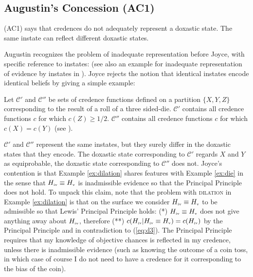 \documentclass[11pt]{article}
\begin{document}
\subsection{Augustin's Concession (AC1)}
\label{jj1}

(AC1) says that credences do not adequately represent a doxastic state.
The same instate can reflect different doxastic states.

Augustin recognizes the problem of inadequate representation before
Joyce, with specific reference to instates:   (see also an example for
inadequate representation of evidence by instates in
). Joyce rejects the notion that
identical instates encode identical beliefs by giving a simple
example:

\begin{quotex}
  \label{ex:die} Let $\mathcal{C}'$ and
  $\mathcal{C}''$ be sets of credence functions defined on a partition
  $\{X,Y,Z\}$ corresponding to the result of a roll of a three
  sided-die. $\mathcal{C}'$ contains all credence functions $c$ for
  which $c(Z)\geq{}1/2$. $\mathcal{C}''$ contains all credence
  functions $c$ for which $c(X)=c(Y)$ (see ).
\end{quotex}

$\mathcal{C}'$ and $\mathcal{C}''$ represent the same instates, but
they surely differ in the doxastic states that they encode. The
doxastic state corresponding to $\mathcal{C}'$ regards $X$ and $Y$ as
equiprobable, the doxastic state corresponding to $\mathcal{C}''$ does
not. Joyce's contention is that Example \ref{ex:dilation} shares
features with Example \ref{ex:die} in the sense that
$H_{\mbox{\tiny{iv}}}\equiv{}H_{\mbox{\tiny{v}}}$ is inadmissible
evidence so that the Principal Principle does not hold. To unpack this
claim, note that the problem with \textsc{dilation} in Example
\ref{ex:dilation} is that on the surface we consider
$H_{\mbox{\tiny{iv}}}\equiv{}H_{\mbox{\tiny{v}}}$ to be admissible so
that Lewis' Principal Principle holds: (*)
$H_{\mbox{\tiny{iv}}}\equiv{}H_{\mbox{\tiny{v}}}$ does not give
anything away about $H_{\mbox{\tiny{iv}}}$, therefore (**)
$c(H_{\mbox{\tiny{iv}}}|H_{\mbox{\tiny{iv}}}\equiv{}H_{\mbox{\tiny{v}}})=c(H_{\mbox{\tiny{iv}}})$
by the Principal Principle and in contradiction to (\ref{eq:d3}). The
Principal Principle requires that my knowledge of objective chances is
reflected in my credence, unless there is inadmissible evidence (such
as knowing the outcome of a coin toss, in which case of course I do
not need to have a credence for it corresponding to the bias of the
coin).
\end{document}
